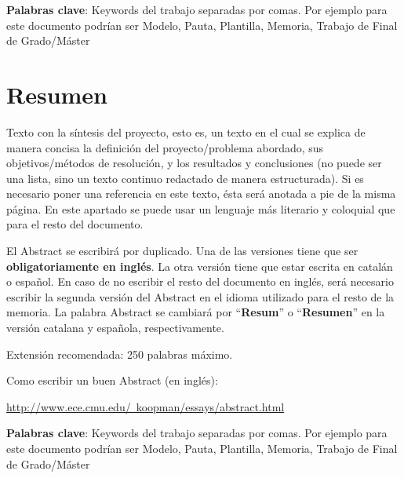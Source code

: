 \vspace{1.5cm}

\textbf{Palabras clave}: Keywords del trabajo separadas por comas. Por ejemplo para este documento podrían ser Modelo, Pauta, Plantilla, Memoria, Trabajo de Final de Grado/Máster

\chapter*{Resumen}

\onehalfspacing

Texto con la síntesis del proyecto, esto es, un texto en el cual se explica de manera concisa la definición del proyecto/problema abordado, sus objetivos/métodos de resolución, y los resultados y conclusiones (no puede ser una lista, sino un texto continuo redactado de manera estructurada). Si es necesario poner una referencia en este texto, ésta será anotada a pie de la misma página. En este apartado se puede usar un lenguaje más literario y coloquial que para el resto del documento.

El Abstract se escribirá por duplicado. Una de las versiones tiene que ser \textbf{obligatoriamente en inglés}. La otra versión tiene que estar escrita en catalán o español. En caso de no escribir el resto del documento en inglés, será necesario escribir la segunda versión del Abstract en el idioma utilizado para el resto de la memoria. La palabra Abstract se cambiará por ``\textbf{Resum}'' o ``\textbf{Resumen}'' en la versión catalana y española, respectivamente. 

Extensión recomendada: 250 palabras máximo.

Como escribir un buen Abstract (en inglés):

\href{http://www.ece.cmu.edu/~koopman/essays/abstract.html}{http://www.ece.cmu.edu/~koopman/essays/abstract.html}

\vspace{1.5cm}

\textbf{Palabras clave}: Keywords del trabajo separadas por comas. Por ejemplo para este documento podrían ser Modelo, Pauta, Plantilla, Memoria, Trabajo de Final de Grado/Máster